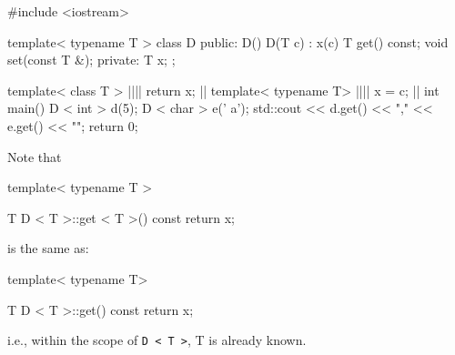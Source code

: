 \begin{consolethree}[escapeinside=||]
#include <iostream>

template< typename T >
class D {
public:
     D(){}
     D(T c) : x(c) {}
     T get() const;
     void set(const T &);
private:
     T x;
};

template< class T >
||||
{   
     return x;
}
||
template< typename T>
||||
{    
     x = c;
}
||
int main()
{   
     D < int > d(5);
     D < char > e(' a');
     std::cout << d.get() << ","
               << e.get() << "\n";
     return 0;
}
 
\end{consolethree}

Note that

\begin{console}
template< typename T >

T D < T >::get < T >() const
{    
     return x;
}
 
\end{console}

is the same as:

\begin{console}
template< typename T>

T D < T >::get() const
{    
     return x;
} 
\end{console}

i.e., within the scope of \texttt{D < T >}, T is already known.

